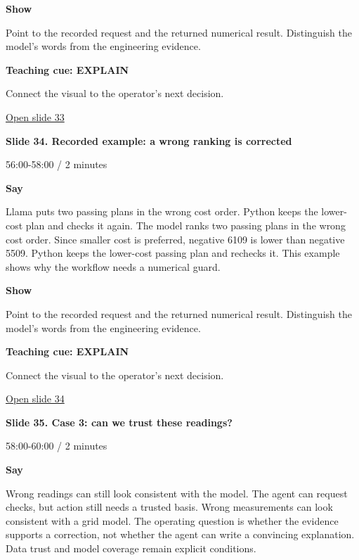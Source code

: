 \documentclass[12pt,letterpaper]{article}
\begin{document}
\textbf{Show}\par Point to the recorded request and the returned numerical result. Distinguish the model's words from the engineering evidence.\par\medskip
\textbf{Teaching cue: EXPLAIN}\par Connect the visual to the operator's next decision.\par\medskip
\vfill\href{https://alaaselim-sudo.github.io/GridGuard-Agentic-AI-Tutorials/operator-cases/#/33}{Open slide 33}\par
\clearpage{}
{\Large\bfseries\color{IEEEBlue} Slide 34. Recorded example: a wrong ranking is corrected\par}\medskip
{\small\color{Slate} 56:00-58:00 /\allowbreak{} 2 minutes\par}\medskip
\textbf{Say}\par Llama puts two passing plans in the wrong cost order. Python keeps the lower-cost plan and checks it again. The model ranks two passing plans in the wrong cost order. Since smaller cost is preferred, negative 6109 is lower than negative 5509. Python keeps the lower-cost passing plan and rechecks it. This example shows why the workflow needs a numerical guard.\par\medskip
\textbf{Show}\par Point to the recorded request and the returned numerical result. Distinguish the model's words from the engineering evidence.\par\medskip
\textbf{Teaching cue: EXPLAIN}\par Connect the visual to the operator's next decision.\par\medskip
\vfill\href{https://alaaselim-sudo.github.io/GridGuard-Agentic-AI-Tutorials/operator-cases/#/34}{Open slide 34}\par
\clearpage{}
{\Large\bfseries\color{IEEEBlue} Slide 35. Case 3: can we trust these readings?\par}\medskip
{\small\color{Slate} 58:00-60:00 /\allowbreak{} 2 minutes\par}\medskip
\textbf{Say}\par Wrong readings can still look consistent with the model. The agent can request checks, but action still needs a trusted basis. Wrong measurements can look consistent with a grid model. The operating question is whether the evidence supports a correction, not whether the agent can write a convincing explanation. Data trust and model coverage remain explicit conditions.\par\medskip
\end{document}
